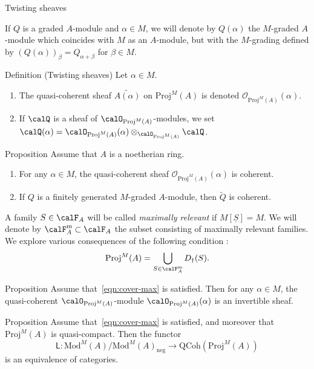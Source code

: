 \documentclass[9pt]{beamer}
\begin{document}
\begin{frame}{Twisting sheaves}

If $Q$ is a graded $A$-module and $\alpha \in M$, we will denote by $Q(\alpha)$ the $M$-graded $A$-module which coincides with $M$ as an $A$-module, but with the $M$-grading defined by $(Q(\alpha))_\beta = Q_{\alpha+\beta}$ for $\beta \in M$.


\begin{block}{Definition (Twisting sheaves)}
Let $\alpha \in M$.
\begin{enumerate}
\item
The quasi-coherent sheaf $\widetilde{A(\alpha)}$ on $\mathrm{Proj}^M(A)$ is 
denoted $\mathcal{O}_{\mathrm{Proj}^M(A)} (\alpha)$.
\item
If $\calQ$ is a sheaf of $\calO_{\mathrm{Proj}^M(A)}$-modules, we set $\calQ (\alpha) = \calO_{\mathrm{Proj}^M(A)} (\alpha ) \otimes_{\calO_{\mathrm{Proj}^M(A)}} \calQ$.
\end{enumerate}
\end{block}


\begin{block}{Proposition}
Assume that $A$ is a noetherian ring.
\begin{enumerate}
\item
For any $\alpha \in M$, the quasi-coherent sheaf $\mathcal{O}_{\mathrm{Proj}^M(A)} (\alpha)$ is coherent.
\item
If $Q$ is a finitely generated $M$-graded $A$-module, then $\widetilde{Q}$ is coherent.
\end{enumerate}
\end{block}


\end{frame}

\begin{frame}

A family $S \in \calF_A$ will be called \emph{maximally relevant} if $M[\underline{S}]=M$.   We will denote by $\calF_A^{\mathrm{m}} \subset \calF_A$ the subset consisting of maximally relevant families. We explore various consequences of the following condition :
\begin{equation}
\label{eqn:cover-max}
\mathrm{Proj}^M(A) = \bigcup_{S \in \calF_A^{\mathrm{m}}} D_\dag(S).
\end{equation}


\begin{block}{Proposition}
Assume that~\eqref{eqn:cover-max} is satisfied. Then for any $ \alpha \in M$, the quasi-coherent $\calO_{\mathrm{Proj}^M(A)}$-module $\calO_{\mathrm{Proj}^M(A)} (\alpha)$ is an invertible sheaf.
\end{block}

\begin{block}{Proposition}
Assume that~\eqref{eqn:cover-max} is satisfied, and moreover that $\mathrm{Proj}^M(A)$ is quasi-compact. Then the functor
\[
\mathsf{L} : \mathrm{Mod}^M(A) / \mathrm{Mod}^M(A)_{\mathrm{neg}} \to \mathrm{QCoh}(\mathrm{Proj}^M(A))
\]
is an equivalence of categories.
\end{block}
\end{frame}
\end{document}
